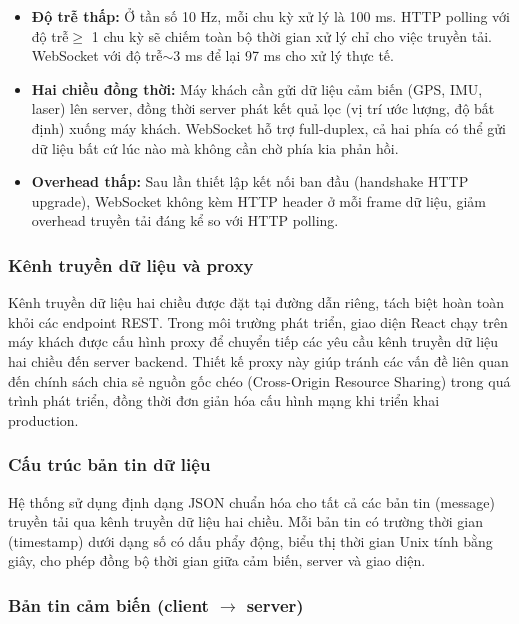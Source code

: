 \begin{itemize}
    \item \textbf{Độ trễ thấp:} Ở tần số 10 Hz, mỗi chu kỳ xử lý là 100 ms. HTTP polling với độ trễ$\geq$ 1 chu kỳ sẽ chiếm toàn bộ thời gian xử lý chỉ cho việc truyền tải. WebSocket với độ trễ$\sim$3 ms để lại 97 ms cho xử lý thực tế.

    \item \textbf{Hai chiều đồng thời:} Máy khách cần gửi dữ liệu cảm biến (GPS, IMU, laser) lên server, đồng thời server phát kết quả lọc (vị trí ước lượng, độ bất định) xuống máy khách. WebSocket hỗ trợ full-duplex, cả hai phía có thể gửi dữ liệu bất cứ lúc nào mà không cần chờ phía kia phản hồi.

    \item \textbf{Overhead thấp:} Sau lần thiết lập kết nối ban đầu (handshake HTTP upgrade), WebSocket không kèm HTTP header ở mỗi frame dữ liệu, giảm overhead truyền tải đáng kể so với HTTP polling.
\end{itemize}

\subsubsection{Kênh truyền dữ liệu và proxy}

\hspace{0.5cm} Kênh truyền dữ liệu hai chiều được đặt tại đường dẫn riêng, tách biệt hoàn toàn khỏi các endpoint REST. Trong môi trường phát triển, giao diện React chạy trên máy khách được cấu hình proxy để chuyển tiếp các yêu cầu kênh truyền dữ liệu hai chiều đến server backend. Thiết kế proxy này giúp tránh các vấn đề liên quan đến chính sách chia sẻ nguồn gốc chéo (Cross-Origin Resource Sharing) trong quá trình phát triển, đồng thời đơn giản hóa cấu hình mạng khi triển khai production.

\subsubsection{Cấu trúc bản tin dữ liệu}

\hspace{0.5cm} Hệ thống sử dụng định dạng JSON chuẩn hóa cho tất cả các bản tin (message) truyền tải qua kênh truyền dữ liệu hai chiều. Mỗi bản tin có trường thời gian (timestamp) dưới dạng số có dấu phẩy động, biểu thị thời gian Unix tính bằng giây, cho phép đồng bộ thời gian giữa cảm biến, server và giao diện.

\subsubsection{Bản tin cảm biến (client \texorpdfstring{$\to$}{to} server)}

